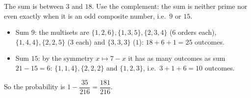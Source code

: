 The sum is between $3$ and $18$. Use the complement: the sum is neither prime nor even exactly when it is an odd composite number, i.e.\ $9$ or $15$.
\begin{itemize}
\item Sum $9$: the multisets are $\{1,2,6\},\{1,3,5\},\{2,3,4\}$ ($6$ orders each), $\{1,4,4\},\{2,2,5\}$ ($3$ each) and $\{3,3,3\}$ ($1$): $18+6+1=25$ outcomes.
\item Sum $15$: by the symmetry $x\mapsto7-x$ it has as many outcomes as sum $21-15=6$: $\{1,1,4\},\{2,2,2\}$ and $\{1,2,3\}$, i.e.\ $3+1+6=10$ outcomes.
\end{itemize}
So the probability is $1-\dfrac{35}{216}=\boxed{\dfrac{181}{216}}$.
